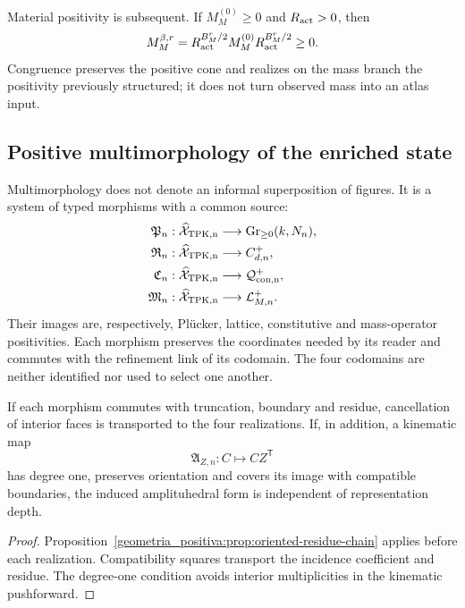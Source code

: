 Material positivity is subsequent. If \(M_M^{(0)}\ge0\) and \(R_{\rm act}>0\), then
\begin{equation}
 M_M^{\beta,r}=R_{\rm act}^{B_M^r/2}
 M_M^{(0)}R_{\rm act}^{B_M^r/2}\ge0.
 \label{geometria_positiva:eq:material-positive-congruence}
\end{equation}
Congruence preserves the positive cone and realizes on the mass branch the positivity previously structured; it does not turn observed mass into an atlas input.

\subsection{Positive multimorphology of the enriched state}

Multimorphology does not denote an informal superposition of figures. It is a system of typed morphisms with a common source:
\[
\begin{aligned}
\mathfrak P_n&:\widehat{\mathcal X}_{\rm TPK,n}
\longrightarrow\operatorname{Gr}_{\ge0}(k,N_n),\\
\mathfrak R_n&:\widehat{\mathcal X}_{\rm TPK,n}
\longrightarrow C^+_{d,n},\\
\mathfrak C_n&:\widehat{\mathcal X}_{\rm TPK,n}
\longrightarrow\mathcal Q^+_{\rm con,n},\\
\mathfrak M_n&:\widehat{\mathcal X}_{\rm TPK,n}
\longrightarrow\mathcal L^+_{M,n}.
\end{aligned}
\]
Their images are, respectively, Plücker, lattice, constitutive and mass-operator positivities. Each morphism preserves the coordinates needed by its reader and commutes with the refinement link of its codomain. The four codomains are neither identified nor used to select one another.

\begin{proposition}
\label{geometria_positiva:prop:multimorphology-coherence} If each morphism commutes with truncation, boundary and residue, cancellation of interior faces is transported to the four realizations. If, in addition, a kinematic map
\[
\mathfrak A_{Z,n}:C\longmapsto CZ^{\mathsf T}
\]
has degree one, preserves orientation and covers its image with compatible boundaries, the induced amplituhedral form is independent of representation depth.
\end{proposition}
\begin{proof}
Proposition~\ref{geometria_positiva:prop:oriented-residue-chain} applies before each realization. Compatibility squares transport the incidence coefficient and residue. The degree-one condition avoids interior multiplicities in the kinematic pushforward.
\end{proof}

